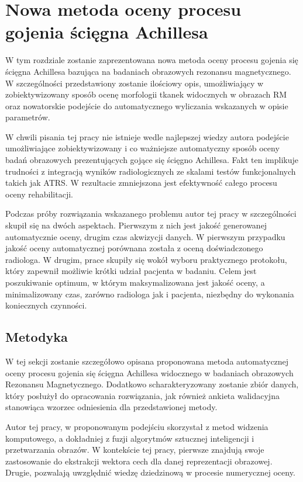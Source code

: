 \chapter{Nowa metoda oceny procesu gojenia ścięgna Achillesa}
\label{NewMethod}

W tym rozdziale zostanie zaprezentowana nowa metoda oceny procesu gojenia się ścięgna Achillesa bazująca na badaniach obrazowych rezonansu magnetycznego. W szczególności przedstawiony zostanie ilościowy opis, umożliwiający w zobiektywizowany sposób ocenę morfologii tkanek widocznych w obrazach RM oraz nowatorskie podejście do automatycznego wyliczania wskazanych w opisie parametrów. 

W chwili pisania tej pracy nie istnieje wedle najlepszej wiedzy autora podejście umożliwiające zobiektywizowany i co ważniejsze automatyczny sposób oceny badań obrazowych prezentujących gojące się ścięgno Achillesa. Fakt ten implikuje trudności z integracją wyników radiologicznych ze skalami testów funkcjonalnych takich jak ATRS. W rezultacie zmniejszona jest efektywność całego procesu oceny rehabilitacji. 

Podczas próby rozwiązania wskazanego problemu autor tej pracy w szczególności skupił się na dwóch aspektach. Pierwszym z nich jest jakość generowanej automatycznie oceny, drugim czas akwizycji danych. W pierwszym przypadku jakość oceny automatycznej porównana została z oceną doświadczonego radiologa. W drugim, prace skupiły się wokół wyboru praktycznego protokołu, który zapewnił możliwie krótki udział pacjenta w badaniu. Celem jest poszukiwanie optimum, w którym maksymalizowana jest jakość oceny, a minimalizowany czas, zarówno radiologa jak i pacjenta, niezbędny do wykonania koniecznych czynności. 


\section{Metodyka}
\label{seq:method}
W tej sekcji zostanie szczegółowo opisana proponowana metoda automatycznej oceny procesu gojenia się ścięgna Achillesa widocznego w badaniach obrazowych Rezonansu Magnetycznego. Dodatkowo scharakteryzowany zostanie zbiór danych, który posłużył do opracowania rozwiązania, jak również ankieta walidacyjna stanowiąca wzorzec odniesienia dla przedstawionej metody. 

Autor tej pracy, w proponowanym podejściu skorzystał z metod widzenia komputowego, a dokładniej z fuzji algorytmów sztucznej inteligencji i przetwarzania obrazów. W kontekście tej pracy, pierwsze znajdują swoje zastosowanie do ekstrakcji wektora cech dla danej reprezentacji obrazowej. Drugie, pozwalają uwzględnić wiedzę dziedzinową w procesie numerycznej oceny.

